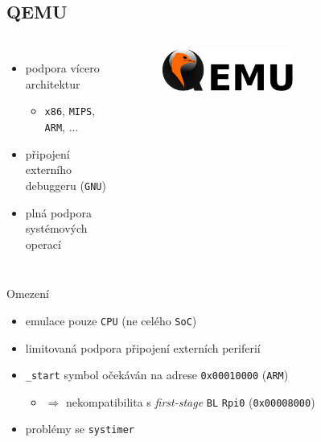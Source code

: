 \documentclass[compress]{beamer}
\begin{document}
\subsection{QEMU}

\begin{frame}
	\begin{columns}
		\begin{itemize}
			\item podpora vícero architektur
			\begin{itemize}
				\item \texttt{x86}, \texttt{MIPS}, \texttt{ARM}, ...
			\end{itemize}
			\item připojení externího debuggeru (\texttt{GNU})
			\item plná podpora systémových operací
		\end{itemize}
		\begin{figure}
			\centering
			\includegraphics[width=0.6\textwidth]{img/Qemu_logo.pdf}
			\caption{\href{https://www.qemu.org}{}}
			\label{QEMU}
		\end{figure}
	\end{columns}
	\vspace{0.4cm}
	\noindent\makebox[\linewidth]{\rule{\textwidth}{0.4pt}}
	\begin{block}{Omezení}
		\begin{itemize}
			\item emulace pouze \texttt{CPU} (ne celého \texttt{SoC})
			\item limitovaná podpora připojení externích periferií
			\item \texttt{\_start} symbol očekáván na adrese \texttt{0x00010000} (\texttt{ARM})
			\begin{itemize}
				\item $\Rightarrow$ nekompatibilita s \textit{first-stage} \texttt{BL} \texttt{Rpi0} (\texttt{0x00008000})
			\end{itemize}
			\item problémy se \texttt{systimer}
		\end{itemize}
	\end{block}
\end{frame}
\end{document}
